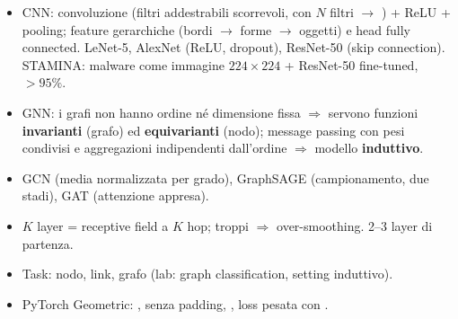 \begin{sintesi}
\begin{itemize}
  \item CNN: convoluzione (filtri addestrabili scorrevoli, \code{[d,h,w]} con $N$ filtri $\to$ \code{[N,h,w]}) + ReLU + pooling;
        feature gerarchiche (bordi $\to$ forme $\to$ oggetti) e head fully connected. LeNet-5, AlexNet (ReLU, dropout), ResNet-50
        (skip connection). STAMINA: malware come immagine $224\times224$ + ResNet-50 fine-tuned, $>95\%$.
  \item GNN: i grafi non hanno ordine né dimensione fissa $\Rightarrow$ servono funzioni \textbf{invarianti} (grafo) ed \textbf{equivarianti}
        (nodo); message passing con pesi condivisi e aggregazioni indipendenti dall'ordine $\Rightarrow$ modello \textbf{induttivo}.
  \item GCN (media normalizzata per grado), GraphSAGE (campionamento, due stadi), GAT (attenzione appresa).
  \item $K$ layer = receptive field a $K$ hop; troppi $\Rightarrow$ over-smoothing. 2--3 layer di partenza.
  \item Task: nodo, link, grafo (lab: graph classification, setting induttivo).
  \item PyTorch Geometric: ,  senza padding, , loss pesata con
        .
\end{itemize}
\end{sintesi}

